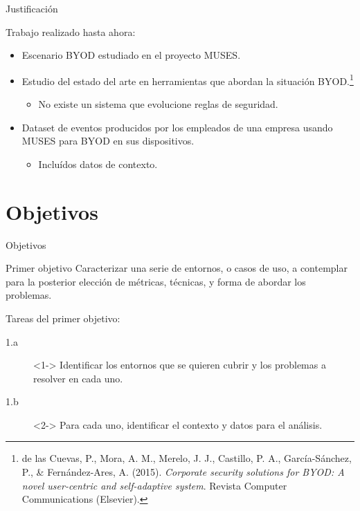 \documentclass{beamer}
\begin{document}
\begin{frame}{Justificación}

Trabajo realizado hasta ahora:

\begin{itemize}
  \item<1-> Escenario BYOD estudiado en el proyecto MUSES.
  \item<2-> Estudio del estado del arte en herramientas que abordan la situación BYOD.\footnote{{\scriptsize de las Cuevas, P., Mora, A. M., Merelo, J. J., Castillo, P. A., García-Sánchez, P., \& Fernández-Ares, A. (2015). \textit{Corporate security solutions for BYOD: A novel user-centric and self-adaptive system}. Revista Computer Communications (Elsevier).}}
  \begin{itemize}
    \item<3-> No existe un sistema que evolucione reglas de seguridad.
  \end{itemize}
  \item<4-> Dataset de eventos producidos por los empleados de una empresa usando MUSES para BYOD en sus dispositivos.
  \begin{itemize}
    \item<5-> Incluídos datos de contexto.
  \end{itemize}
\end{itemize}

\end{frame}


\section{Objetivos}

\begin{frame}{Objetivos}

\begin{block}{Primer objetivo}
Caracterizar una serie de entornos, o casos de uso, a contemplar para la posterior elección de métricas, técnicas, y forma de abordar los problemas.
\end{block}

Tareas del primer objetivo:

\begin{description}
  \item[1.a]<1-> Identificar los entornos que se quieren cubrir y los problemas a resolver en cada uno.
  \item[1.b]<2-> Para cada uno, identificar el contexto y datos para el análisis.
\end{description}

\end{frame}
\end{document}
